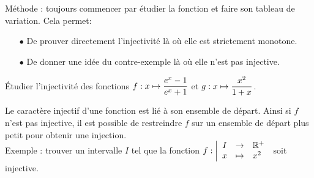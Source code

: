 \documentclass[a4paper, 11pt]{article}
\begin{document}
M\'ethode : toujours commencer par \'etudier la fonction et faire son tableau de variation. Cela permet:
\begin{itemize}
	\item[$\bullet$] De prouver directement l'injectivit\'e l\`{a} o\`{u} elle est strictement monotone.
	\item[$\bullet$] De donner une id\'ee du contre-exemple l\`{a} o\`{u} elle n'est pas injective.\vsec
\end{itemize}

\setlength\fboxrule{0.5pt}

{\footnotesize
	\begin{exercice}
		\'Etudier l'injectivit\'e des fonctions $f: x \mapsto \displaystyle\frac{e^x-1}{e^x+1}$ et $g:x\mapsto \displaystyle\frac{x^2}{1+x}$.
	\end{exercice}}




% 

\begin{rem}
	Le caract\`{e}re injectif d'une fonction est li\'e \`{a} son ensemble de d\'epart. Ainsi si $f$ n'est pas injective, il est possible de restreindre $f$ sur un ensemble de d\'epart plus petit pour obtenir une injection.\\
	\noindent Exemple : trouver un intervalle $I$ tel que la fonction $f : \left| \begin{array}{ccl}
			I & \rightarrow & \mathbb{R}^+ \\
			x & \mapsto     & x^2
		\end{array} \right.$ soit injective.

\end{rem}

%
\end{document}
